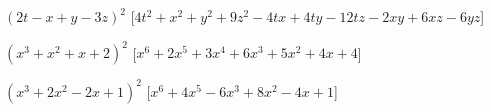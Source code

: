 \begin{esercizio}
\begin{enumeratea}
\item \(\left(2t-x+y-3z\right)^{2}\)
  \hfill [\(4t^2+x^2+y^2+9z^2-4tx+4ty-12tz-2xy+6xz-6yz\)]
\item \(\left(x^3+x^2+x+2\right)^{2}\)
  \hfill [\(x^6 + 2x^5 + 3x^4 + 6x^3 + 5x^2 + 4x + 4\)]
\item \(\left(x^3+2x^2-2x+1\right)^{2}\)
  \hfill [\(x^{6} + 4 x^{5} - 6 x^{3} + 8 x^{2} - 4 x + 1\)]

\end{enumeratea}
\end{esercizio}
